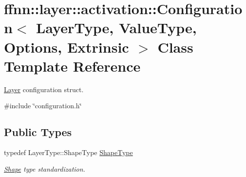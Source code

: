 \hypertarget{classffnn_1_1layer_1_1activation_1_1_configuration}{\section{ffnn\-:\-:layer\-:\-:activation\-:\-:Configuration$<$ Layer\-Type, Value\-Type, Options, Extrinsic $>$ Class Template Reference}
\label{classffnn_1_1layer_1_1activation_1_1_configuration}
}


\hyperlink{classffnn_1_1layer_1_1_layer}{Layer} configuration struct.  




{\ttfamily \#include \char`\"{}configuration.\-h\char`\"{}}

\subsection*{Public Types}
\begin{DoxyCompactItemize}
\item 
typedef Layer\-Type\-::\-Shape\-Type \hyperlink{classffnn_1_1layer_1_1activation_1_1_configuration_a832eb6a16c052e532341dcf1a5a03f0d}{Shape\-Type}
\begin{DoxyCompactList}\small\item\em \hyperlink{structffnn_1_1layer_1_1_shape}{Shape} type standardization. \end{DoxyCompactList}\end{DoxyCompactItemize}
